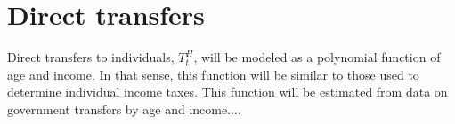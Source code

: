 %

 \section{Direct transfers}
      Direct transfers to individuals, $T^{H}_{t}$, will be modeled as a polynomial function of age and income.  In that sense, this function will be similar to those used to determine individual income taxes.  This function will be estimated from data on government transfers by age and income....

